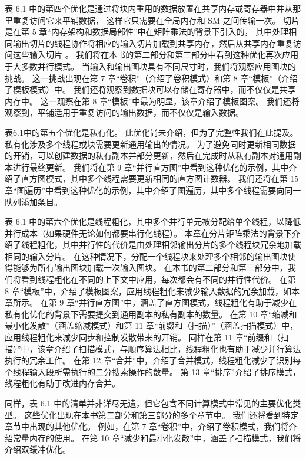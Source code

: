 表 6.1 中的第四个优化是通过将块内重用的数据放置在共享内存或寄存器中并从那里重复访问它来平铺数据，
这样它只需要在全局内存和 SM 之间传输一次。 切片是在第 5 章“内存架构和数据局部性”中在矩阵乘法的背景下引入的，
其中处理相同输出切片的线程协作将相应的输入切片加载到共享内存，然后从共享内存重复访问这些输入切片 。 
我们将在本书的第二部分和第三部分中看到这种优化再次应用于大多数并行模式。 
当输入和输出图块具有不同尺寸时，我们将观察应用图块的挑战。 
这一挑战出现在第 7 章“卷积”（介绍了卷积模式）和第 8 章“模板”（介绍了模板模式）中。 
我们还将观察到数据块可以存储在寄存器中，而不仅仅是共享内存中。 
这一观察在第 8 章“模板”中最为明显，该章介绍了模板图案。 
我们还将观察到，平铺适用于重复访问的输出数据，而不仅仅是输入数据。

表6.1中的第五个优化是私有化。 此优化尚未介绍，但为了完整性我们在此提及。 
私有化涉及多个线程或块需要更新通用输出的情况。 
为了避免同时更新相同数据的开销，可以创建数据的私有副本并部分更新，然后在完成时从私有副本对通用副本进行最终更新。 
我们将在第 9 章“并行直方图”中看到这种优化的示例，其中介绍了直方图模式，其中多个线程需要更新相同的直方图计数器。 
我们还将在第 15 章“图遍历”中看到这种优化的示例，其中介绍了图遍历，其中多个线程需要向同一队列添加条目。

表 6.1 中的第六个优化是线程粗化，其中多个并行单元被分配给单个线程，以降低并行成本（如果硬件无论如何都要串行化线程）。 
本章在分片矩阵乘法的背景下介绍了线程粗化，其中并行性的代价是由处理相邻输出分片的多个线程块冗余地加载相同的输入分片。 
在这种情况下，分配一个线程块来处理多个相邻的输出图块使得能够为所有输出图块加载一次输入图块。 
在本书的第二部分和第三部分中，我们将看到线程粗化在不同的上下文中应用，每次都会有不同的并行性代价。 
在第 8 章“模板”中，介绍了模板图案，应用线程粗化来减少输入数据的冗余加载，如本章所示。 
在第 9 章“并行直方图”中，涵盖了直方图模式，线程粗化有助于减少在私有化优化的背景下需要提交到通用副本的私有副本的数量。 
在第 10 章“缩减和最小化发散”（涵盖缩减模式）和第 11 章“前缀和（扫描）”（涵盖扫描模式）中，
应用线程粗化来减少同步和控制发散带来的开销。 
同样在第 11 章“前缀和（扫描）”中，该章介绍了扫描模式，与顺序算法相比，线程粗化也有助于减少并行算法执行的冗余工作。 
在第 12 章“合并”中，介绍了合并模式，线程粗化减少了识别每个线程输入段所需执行的二分搜索操作的数量。 
第 13 章“排序”介绍了排序模式，线程粗化有助于改进内存合并。

同样，表 6.1 中的清单并非详尽无遗，但它包含不同计算模式中常见的主要优化类型。 
这些优化出现在本书第二部分和第三部分的多个章节中。 我们还将看到特定章节中出现的其他优化。 
例如，在第 7 章“卷积”中，介绍了卷积模式，我们将介绍常量内存的使用。 
在第 10 章“减少和最小化发散”中，涵盖了扫描模式，我们将介绍双缓冲优化。

